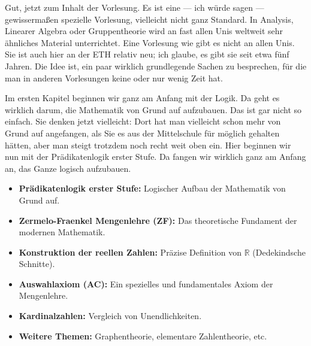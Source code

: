 \begin{spoken-clean}[00:18:50 - 00:21:15]
Gut, jetzt zum Inhalt der Vorlesung. Es ist eine --- ich würde sagen --- gewissermaßen spezielle Vorlesung, vielleicht nicht ganz Standard. In Analysis, Linearer Algebra oder Gruppentheorie wird an fast allen Unis weltweit sehr ähnliches Material unterrichtet. Eine Vorlesung wie  gibt es nicht an allen Unis. Sie ist auch hier an der ETH relativ neu; ich glaube, es gibt sie seit etwa fünf Jahren. Die Idee ist, ein paar wirklich grundlegende Sachen zu besprechen, für die man in anderen Vorlesungen keine oder nur wenig Zeit hat.

Im ersten Kapitel beginnen wir ganz am Anfang mit der Logik. Da geht es wirklich darum, die Mathematik von Grund auf aufzubauen. Das ist gar nicht so einfach. Sie denken jetzt vielleicht:  Dort hat man vielleicht schon mehr von Grund auf angefangen, als Sie es aus der Mittelschule für möglich gehalten hätten, aber man steigt trotzdem noch recht weit oben ein. Hier beginnen wir nun mit der Prädikatenlogik erster Stufe. Da fangen wir wirklich ganz am Anfang an, das Ganze logisch aufzubauen.
\end{spoken-clean}

\begin{math-stroke}
\begin{itemize}
    \item \textbf{Prädikatenlogik erster Stufe:} Logischer Aufbau der Mathematik von Grund auf.
    \item \textbf{Zermelo-Fraenkel Mengenlehre (ZF):} Das theoretische Fundament der modernen Mathematik.
    \item \textbf{Konstruktion der reellen Zahlen:} Präzise Definition von $\mathbb{R}$ (Dedekindsche Schnitte).
    \item \textbf{Auswahlaxiom (AC):} Ein spezielles und fundamentales Axiom der Mengenlehre.
    \item \textbf{Kardinalzahlen:} Vergleich von Unendlichkeiten.
    \item \textbf{Weitere Themen:} Graphentheorie, elementare Zahlentheorie, etc.
\end{itemize}
\end{math-stroke}

